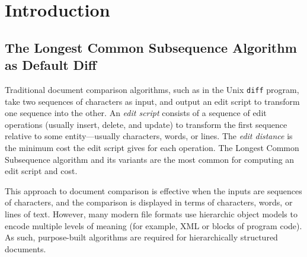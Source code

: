 \documentclass{article}
\title{\papertitle}
\begin{document}
%
\capstartfalse
\maketitle
\capstarttrue
%
\begin{abstract}
We describe an application of hierarchic diff to the collaborative editing of tree-based music representations,
using Zhang and Shasha's tree edit distance algorithm as implemented within the XUDiff tool.
The edit distance between two trees is the minimum number of edit operations necessary to transform one tree into the other.
We consider common operations on the score tree---deleting, changing, and appending tree nodes----to derive a minimal edit sequence,
known as an edit script, and we benchmark the widely used Longest Common Subsequence algorithm against our approach to demonstrate its superior performance.
\end{abstract}
%

\section{Introduction}\label{sec:introduction}
\subsection{The Longest Common Subsequence Algorithm as Default Diff}
Traditional document comparison algorithms, such as in the Unix \texttt{diff} program,
take two sequences of characters as input, and output an edit script to transform one sequence into the other.
An \emph{edit script} consists of a sequence of edit operations (usually insert, delete, and update)
to transform the first sequence relative to some entity---usually characters, words, or lines.
The \emph{edit distance} is the minimum cost the edit script gives for each operation.
The Longest Common Subsequence algorithm and its variants are the most common for computing an edit script and cost.

This approach to document comparison is effective when the inputs are sequences of characters,
and the comparison is displayed in terms of characters, words, or lines of text.
However, many modern file formats use hierarchic object models to encode multiple
levels of meaning (for example, XML or blocks of program code).
As such, purpose-built algorithms are required for hierarchically structured documents.
\end{document}
